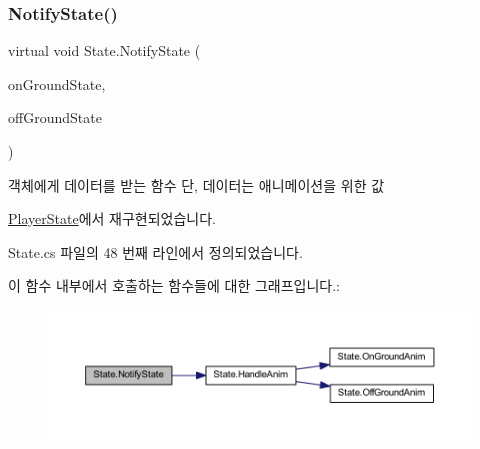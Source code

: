 \subsubsection{\texorpdfstring{NotifyState()}{NotifyState()}}
{\footnotesize\ttfamily virtual void State.\+Notify\+State (\begin{DoxyParamCaption}\item[{\mbox{\hyperlink{class_state_ab9eb1c1d81f1903b8486d1275e78b68e}{On\+Ground}}}]{on\+Ground\+State,  }\item[{\mbox{\hyperlink{class_state_a7d945e793324c017a973205564cf1a56}{Off\+Ground}}}]{off\+Ground\+State }\end{DoxyParamCaption})\hspace{0.3cm}{\ttfamily [virtual]}}



객체에게 데이터를 받는 함수 단, 데이터는 애니메이션을 위한 값 



\mbox{\hyperlink{class_player_state_a59f3f64c24ba1b6e34e34cb23746ecb0}{Player\+State}}에서 재구현되었습니다.



State.\+cs 파일의 48 번째 라인에서 정의되었습니다.


\begin{DoxyCode}{0}

\end{DoxyCode}
이 함수 내부에서 호출하는 함수들에 대한 그래프입니다.\+:\nopagebreak
\begin{figure}[H]
\begin{center}
\leavevmode
\includegraphics[width=350pt]{d0/d8b/class_state_a989a27f9b711812d983344ee381da419_cgraph}
\end{center}
\end{figure}
\mbox{\label{class_state_a2909a234430fa7752fadf2bb993ab5e2}} 
